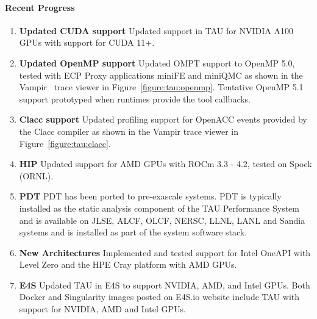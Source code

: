 \paragraph{Recent Progress}
\begin{enumerate}
\item \textbf{Updated CUDA support} Updated support in TAU for NVIDIA A100 GPUs with support for CUDA 11+.

\item \textbf{Updated OpenMP support} Updated OMPT support to OpenMP 5.0, tested with ECP Proxy applications miniFE and miniQMC as shown in the Vampir~\cite{vampir.eu} trace viewer in Figure~\ref{figure:tau:openmp}.  Tentative OpenMP 5.1 support prototyped when runtimes provide the tool callbacks.

\item \textbf{Clacc support} Updated profiling support for OpenACC events provided by the Clacc compiler as shown in the Vampir trace viewer in Figure~\ref{figure:tau:clacc}.

\item \textbf{HIP} Updated support for AMD GPUs with ROCm 3.3 - 4.2, tested on Spock (ORNL).

\item \textbf{PDT} PDT has been ported to pre-exascale systems.  PDT is
typically installed as the static analysis component of the TAU Performance
System and is available on JLSE, ALCF, OLCF, NERSC, LLNL, LANL and Sandia
systems and is installed as part of the system software stack.


\item \textbf{New Architectures}
Implemented and tested support for Intel OneAPI with Level Zero and the HPE Cray platform with AMD GPUs.

\item \textbf{E4S} Updated TAU in E4S to support NVIDIA, AMD, and Intel GPUs. Both Docker and Singularity images posted on E4S.io website include TAU with support for NVIDIA, AMD and Intel GPUs.



\end{enumerate}
